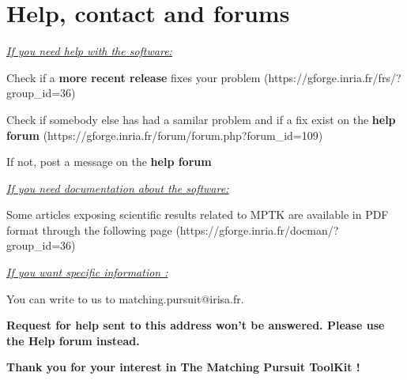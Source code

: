 \chapter{Help, contact and forums}

\noindent \underline{\emph{If you need help with the software:}}
\begin{my_enumerate}
	\item Check if a \textbf{more recent release} fixes your problem (https://gforge.inria.fr/frs/?group\_id=36)
	\item Check if somebody else has had a samilar problem and if a fix exist on the \textbf{help forum} (https://gforge.inria.fr/forum/forum.php?forum\_id=109)
	\item If not, post a message on the \textbf{help forum}
\end{my_enumerate}

\noindent \underline{\emph{If you need documentation about the software:}}

\vspace{0.2 cm}

Some articles exposing scientific results related to MPTK are available in PDF format through the following page (https://gforge.inria.fr/docman/?group\_id=36)

\vspace{0.2 cm}

\noindent \underline{\emph{If you want specific information :}}

\vspace{0.2 cm}

You can write to us to matching.pursuit@irisa.fr.


\begin{center}
	\Large{\textbf{Request for help sent to this address won't be answered. Please use the Help forum instead.}}
\end{center}
\noindent \textbf{Thank you for your interest in The Matching Pursuit ToolKit ! }


